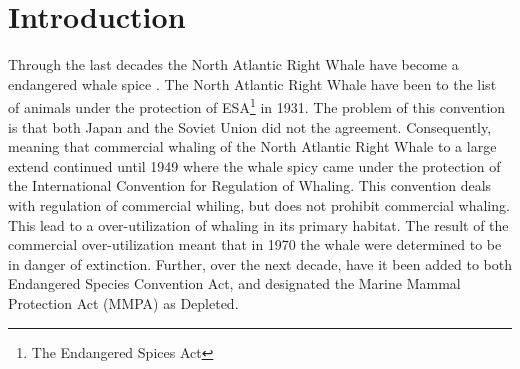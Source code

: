 \section{Introduction}
Through the last decades the North Atlantic Right Whale have become a endangered whale spice \cite{NOAA}. The North Atlantic Right Whale have been to the list of animals under the protection of ESA\footnote{The Endangered Spices Act} in 1931. The problem of this convention is that both Japan and the Soviet Union did not the agreement. Consequently, meaning that commercial whaling of the North Atlantic Right Whale to a large extend continued until 1949 where the whale spicy came under the protection of the International Convention for Regulation of Whaling. This convention deals with regulation of commercial whiling, but does not prohibit commercial whaling. This lead to a over-utilization of whaling in its primary habitat. The result of the commercial over-utilization meant that in 1970 the whale were determined to be in danger of extinction. Further, over the next decade, have it been added to both Endangered Species Convention Act, and designated the Marine Mammal Protection Act (MMPA) as Depleted.


